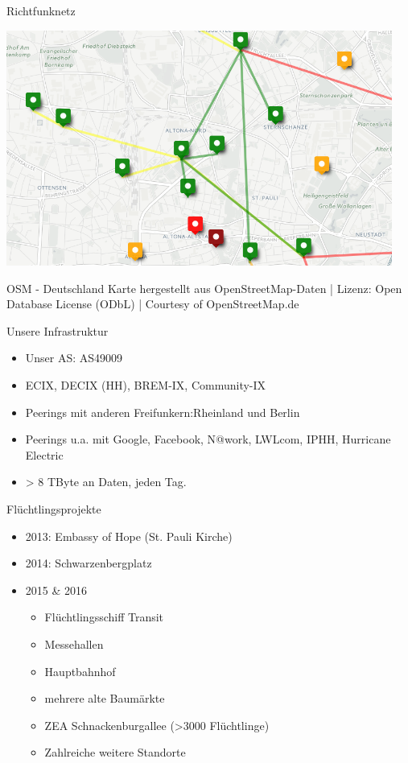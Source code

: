 \documentclass[t]{beamer}
\begin{document}
  \begin{frame}{Richtfunknetz}
    \begin{center}
      \includegraphics[width=0.95\textwidth]{Bilder/richtfunk-uebersicht}
    \end{center}
    \tiny{OSM - Deutschland Karte hergestellt aus OpenStreetMap-Daten | Lizenz: Open Database License (ODbL) | Courtesy of OpenStreetMap.de}
  \end{frame}
  
  \begin{frame}{Unsere Infrastruktur}
    \begin{itemize}
      \item Unser AS: AS49009
      \item ECIX, DECIX (HH), BREM-IX, Community-IX
      \item Peerings mit anderen Freifunkern:\newline Rheinland und Berlin
      \item Peerings u.a. mit Google, Facebook, N@work, LWLcom, IPHH, Hurricane Electric
      \item > 8 TByte an Daten, jeden Tag.
    \end{itemize}
  \end{frame}
  
  \begin{frame}{Flüchtlingsprojekte}
    \begin{itemize}
      \item 2013: Embassy of Hope (St. Pauli Kirche)
      \item 2014: Schwarzenbergplatz
      \item 2015 \& 2016
      \begin{itemize}
        \item Flüchtlingsschiff Transit
        \item Messehallen
        \item Hauptbahnhof
        \item mehrere alte Baumärkte
        \item ZEA Schnackenburgallee (>3000 Flüchtlinge)
        \item Zahlreiche weitere Standorte
      \end{itemize}
    \end{itemize}
  \end{frame}
  
\end{document}
